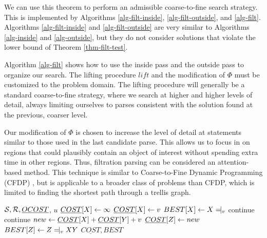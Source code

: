 We can use this theorem to perform an admissible coarse-to-fine search
strategy. This is implemented by Algorithms \ref{alg-filt-inside},
\ref{alg-filt-outside}, and \ref{alg-filt}. Algorithms
\ref{alg-filt-inside} and \ref{alg-filt-outside} are very similar to
Algorithms \ref{alg-inside} and \ref{alg-outside}, but they do not
consider solutions that violate the lower bound of Theorem
\ref{thm-filt-test}.

Algorithm \ref{alg-filt} shows how to use the inside pass and the
outside pass to organize our search. The lifting procedure $lift$ and
the modification of $\Phi$ must be customized to the problem
domain. The lifting procedure will generally be a standard
coarse-to-fine strategy, where we search at higher and higher levels
of detail, always limiting ourselves to parses consistent with the
solution found at the previous, coarser level.

Our modification of $\Phi$ is chosen to increase the level of detail
at statements similar to those used in the last candidate parse. This
allows us to focus in on regions that could plausibly contain an
object of interest without spending extra time in other regions. Thus,
filtration parsing can be considered an attention-based method. This
technique is similar to Coarse-to-Fine Dynamic Programming (CFDP)
\cite{cfdp}, but is applicable to a broader class of problems than
CFDP, which is limited to finding the shortest path through a trellis
graph.

\begin{algorithm}
\caption{$inside(\SSS,\RRR,\underline{OCOST},u)$}
\begin{algorithmic}
  \INPUT ${\mathcal S}, {\mathcal R}, \underline{OCOST}$, $u$
  \STATE $\underline{COST}[X] \leftarrow \infty$
  \STATE $\underline{COST}[X] \leftarrow v$
  \STATE $BEST[X] \from X\tne_v$
  \ENDIF
  \ENDFOR
  \ENDFOR
  \STATE continue
  \ENDIF
  \STATE continue
  \ENDIF
  \STATE $new \leftarrow \underline{COST}[X] + \underline{COST}[Y] + v$
  \STATE $\underline{COST}[Z] \leftarrow new$
  \STATE $BEST[Z] \from Z\tne_v XY$
  \ENDIF
  \ENDFOR
  \ENDFOR
  \RETURN $\underline{COST}, BEST$
\end{algorithmic}
\label{alg-filt-inside}
\end{algorithm}


